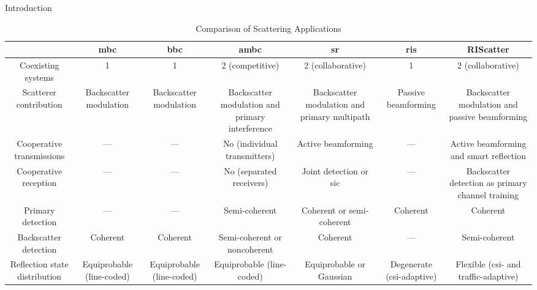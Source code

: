 \documentclass[journal]{IEEEtran}
\begin{document}
\begin{section}{Introduction}
	\begin{table*}[]
		\caption{Comparison of Scattering Applications}
		\label{tb:scattering_applications}
		\begin{tabularx}{\textwidth}{CCCCCCC}
			\toprule
			                              & \gls{mbc}                 & \gls{bbc}                 & \gls{ambc}                                      & \gls{sr}                                     & \gls{ris}                                  & RIScatter                                         \\ \midrule
			Coexisting systems            & 1                         & 1                         & 2 (competitive)                                 & 2 (collaborative)                            & 1                                          & 2 (collaborative)                                 \\ \midrule
			Scatterer contribution        & Backscatter modulation    & Backscatter modulation    & Backscatter modulation and primary interference & Backscatter modulation and primary multipath & Passive beamforming                        & Backscatter modulation and passive beamforming    \\ \midrule
			Cooperative transmissions     & ---                       & ---                       & No (individual transmitters)                    & Active beamforming                           & ---                                        & Active beamforming and smart reflection           \\ \midrule
			Cooperative reception         & ---                       & ---                       & No (separated receivers)                        & Joint detection or \gls{sic}                 & ---                                        & Backscatter detection as primary channel training \\ \midrule
			Primary detection             & ---                       & ---                       & Semi-coherent                                   & Coherent or semi-coherent                    & Coherent                                   & Coherent                                          \\ \midrule
			Backscatter detection         & Coherent                  & Coherent                  & Semi-coherent or noncoherent                    & Coherent                                     & ---                                        & Semi-coherent                                     \\ \midrule
			Reflection state distribution & Equiprobable (line-coded) & Equiprobable (line-coded) & Equiprobable (line-coded)                       & Equiprobable or Gaussian                     & Degenerate (\gls{csi}-adaptive)            & Flexible (\gls{csi}- and traffic-adaptive)        \\ \midrule

\end{tabularx}
\end{table*}
\end{section}
\end{document}
